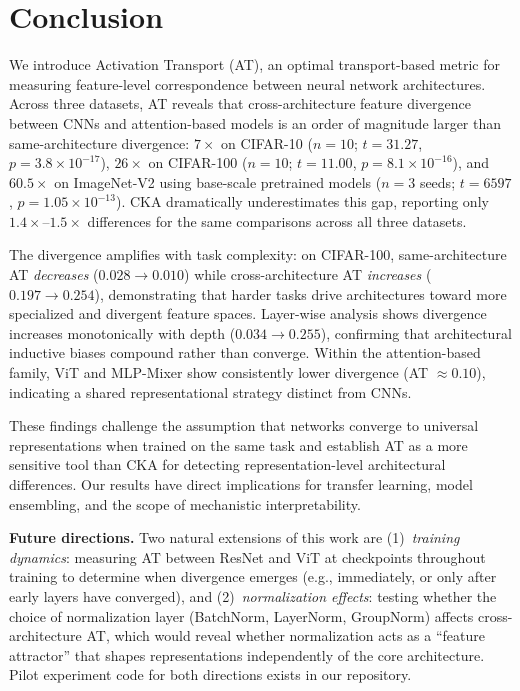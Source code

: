 \documentclass{article}
\begin{document}
\section{Conclusion}
\label{sec:conclusion}

We introduce Activation Transport (AT), an optimal transport-based metric for measuring feature-level correspondence between neural network architectures. Across three datasets, AT reveals that cross-architecture feature divergence between CNNs and attention-based models is an order of magnitude larger than same-architecture divergence: $7\times$ on CIFAR-10 ($n{=}10$; $t = 31.27$, $p = 3.8 \times 10^{-17}$), $26\times$ on CIFAR-100 ($n{=}10$; $t = 11.00$, $p = 8.1 \times 10^{-16}$), and $60.5\times$ on ImageNet-V2 using base-scale pretrained models ($n{=}3$ seeds; $t = 6597$, $p = 1.05 \times 10^{-13}$). CKA dramatically underestimates this gap, reporting only $1.4\times$--$1.5\times$ differences for the same comparisons across all three datasets.

The divergence amplifies with task complexity: on CIFAR-100, same-architecture AT \emph{decreases} ($0.028 \to 0.010$) while cross-architecture AT \emph{increases} ($0.197 \to 0.254$), demonstrating that harder tasks drive architectures toward more specialized and divergent feature spaces. Layer-wise analysis shows divergence increases monotonically with depth ($0.034 \to 0.255$), confirming that architectural inductive biases compound rather than converge. Within the attention-based family, ViT and MLP-Mixer show consistently lower divergence (AT $\approx 0.10$), indicating a shared representational strategy distinct from CNNs.

These findings challenge the assumption that networks converge to universal representations when trained on the same task and establish AT as a more sensitive tool than CKA for detecting representation-level architectural differences. Our results have direct implications for transfer learning, model ensembling, and the scope of mechanistic interpretability.

\textbf{Future directions.} Two natural extensions of this work are (1)~\emph{training dynamics}: measuring AT between ResNet and ViT at checkpoints throughout training to determine when divergence emerges (e.g., immediately, or only after early layers have converged), and (2)~\emph{normalization effects}: testing whether the choice of normalization layer (BatchNorm, LayerNorm, GroupNorm) affects cross-architecture AT, which would reveal whether normalization acts as a ``feature attractor'' that shapes representations independently of the core architecture. Pilot experiment code for both directions exists in our repository.
\end{document}
